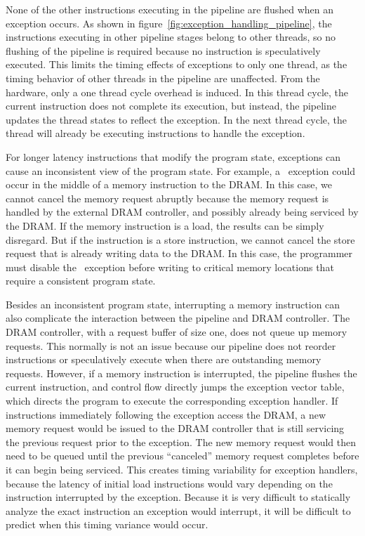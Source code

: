 None of the other instructions executing in the pipeline are flushed when an exception occurs. 
As shown in figure~\ref{fig:exception_handling_pipeline}, the instructions executing in other pipeline stages belong to other threads, so no flushing of the pipeline is required because no instruction is speculatively executed.
This limits the timing effects of exceptions to only one thread, as the timing behavior of other threads in the pipeline are unaffected.
From the hardware, only a one thread cycle overhead is induced. 
In this thread cycle, the current instruction does not complete its execution, but instead, the pipeline updates the thread states to reflect the exception.   
In the next thread cycle, the thread will already be executing instructions to handle the exception.

For longer latency instructions that modify the program state, exceptions can cause an inconsistent view of the program state.
For example, a \timerexpired\ exception could occur in the middle of a memory instruction to the DRAM.
In this case, we cannot cancel the memory request abruptly because the memory request is handled by the external DRAM controller, and possibly already being serviced by the DRAM.
If the memory instruction is a load, the results can be simply disregard.
But if the instruction is a store instruction, we cannot cancel the store request that is already writing data to the DRAM.
In this case, the programmer must disable the \timerexpired\ exception before writing to critical memory locations that require a consistent program state.

Besides an inconsistent program state, interrupting a memory instruction can also complicate the interaction between the pipeline and DRAM controller.
The DRAM controller, with a request buffer of size one, does not queue up memory requests.
This normally is not an issue because our pipeline does not reorder instructions or speculatively execute when there are outstanding memory requests.
However, if a memory instruction is interrupted, the pipeline flushes the current instruction, and control flow directly jumps the exception vector table, which directs the program to execute the corresponding exception handler. 
If instructions immediately following the exception access the DRAM, a new memory request would be issued to the DRAM controller that is still servicing the previous request prior to the exception.
The new memory request would then need to be queued until the previous ``canceled'' memory request completes before it can begin being serviced.
This creates timing variability for exception handlers, because the latency of initial load instructions would vary depending on the instruction interrupted by the exception. 
Because it is very difficult to statically analyze the exact instruction an exception would interrupt, it will be difficult to predict when this timing variance would occur.    

